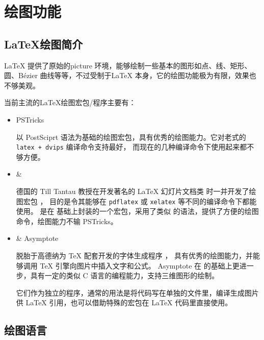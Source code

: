 \chapter{绘图功能}\label{chap:graphics}
\section{\LaTeX{}绘图简介}
\LaTeX{} 提供了原始的picture 环境，能够绘制一些基本的图形如点、线、矩形、圆、Bézier
曲线等等，不过受制于\LaTeX{} 本身，它的绘图功能极为有限，效果也不够美观。

当前主流的\LaTeX{}绘图宏包/程序主要有：
\begin{itemize}
  \item PSTricks \par
以 PostSciprt 语法为基础的绘图宏包，具有优秀的绘图能力。它对老式的 \texttt{latex + dvips} 编译命令支持最好，
而现在的几种编译命令下使用起来都不够方便。

\item {} \&  \par
德国的 Till Tantau 教授在开发著名的 \LaTeX{} 幻灯片文档类  时一并开发了绘图宏包 ，
目的是令其能够在 \texttt{pdflatex} 或 \texttt{xelatex} 等不同的编译命令下都能使用。
 是在  基础上封装的一个宏包，采用了类似  的语法，提供了方便的绘图命令，绘图能力不输 PSTricks。

\item {} \& Asymptote \par
{} 脱胎于高德纳为 \TeX{} 配套开发的字体生成程序 ，
具有优秀的绘图能力，并能够调用 \TeX{} 引擎向图片中插入文字和公式。
Asymptote 在  的基础上更进一步，具有一定的类似 C 语言的编程能力，支持三维图形的绘制。\par
它们作为独立的程序，通常的用法是将代码写在单独的文件里，编译生成图片供 \LaTeX{} 引用，也可以借助特殊的宏包在 \LaTeX{} 代码里直接使用。
\end{itemize}
\section{ 绘图语言}
